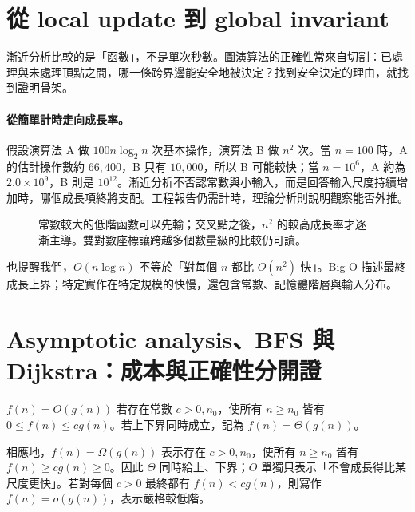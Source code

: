 \documentclass[11pt,a4paper,oneside,openany]{book}
\begin{document}
\section{從 local update 到 global invariant}
\begin{coreintuition}
漸近分析比較的是「函數」，不是單次秒數。圖演算法的正確性常來自切割：已處理與未處理頂點之間，哪一條跨界邊能安全地被決定？找到安全決定的理由，就找到證明骨架。
\end{coreintuition}

\paragraph{從簡單計時走向成長率。}
假設演算法 A 做 $100n\log_2 n$ 次基本操作，演算法 B 做 $n^2$ 次。當 $n=100$ 時，A 的估計操作數約 $66{,}400$，B 只有 $10{,}000$，所以 B 可能較快；當 $n=10^6$，A 約為 $2.0\times10^9$，B 則是 $10^{12}$。漸近分析不否認常數與小輸入，而是回答輸入尺度持續增加時，哪個成長項終將支配。工程報告仍需計時，理論分析則說明觀察能否外推。

\begin{figure}[htbp]
\centering
{}
\caption{常數較大的低階函數可以先輸；交叉點之後，$n^2$ 的較高成長率才逐漸主導。雙對數座標讓跨越多個數量級的比較仍可讀。}
\label{fig:asymptotic-crossover}
\end{figure}

 也提醒我們，$O(n\log n)$ 不等於「對每個 $n$ 都比 $O(n^2)$ 快」。Big-O 描述最終成長上界；特定實作在特定規模的快慢，還包含常數、記憶體階層與輸入分布。

\section{Asymptotic analysis、BFS 與 Dijkstra：成本與正確性分開證}
\begin{definition}
$f(n)=O(g(n))$ 若存在常數 $c>0,n_0$，使所有 $n\ge n_0$ 皆有 $0\le f(n)\le c g(n)$。若上下界同時成立，記為 $f(n)=\Theta(g(n))$。
\end{definition}
相應地，$f(n)=\Omega(g(n))$ 表示存在 $c>0,n_0$，使所有 $n\ge n_0$ 皆有 $f(n)\ge c g(n)\ge0$。因此 $\Theta$ 同時給上、下界；$O$ 單獨只表示「不會成長得比某尺度更快」。若對每個 $c>0$ 最終都有 $f(n)<cg(n)$，則寫作 $f(n)=o(g(n))$，表示嚴格較低階。
\end{document}
